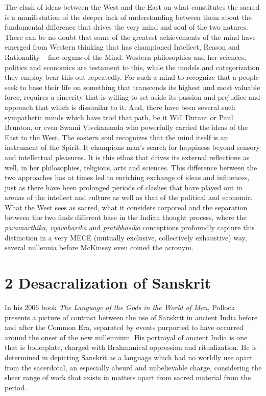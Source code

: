 The clash of ideas between the West and the East on what constitutes the sacred is a manifestation of the deeper lack of understanding between them about the fundamental difference that drives the very mind and soul of the two natures. There can be no doubt that some of the greatest achievements of the mind have emerged from Western thinking that has championed Intellect, Reason and Rationality – fine organs of the Mind. Western philosophies and her sciences, politics and economics are testament to this, while the models and categorization they employ bear this out repeatedly. For such a mind to recognize that a people seek to base their life on something that transcends its highest and most valuable force, requires a sincerity that is willing to set aside its passion and prejudice and approach that which is dissimilar to it. And, there have been several such sympathetic minds which have trod that path, be it Will Durant or Paul Brunton, or even Swami Vivekananda who powerfully carried the ideas of the East to the West. The eastern soul recognizes that the mind itself is an instrument of the Spirit. It champions man’s search for happiness beyond sensory and intellectual pleasures. It is this ethos that drives its external reflections as well, in her philosophies, religions, arts and sciences. This difference between the two approaches has at times led to enriching exchange of ideas and influences, just as there have been prolonged periods of clashes that have played out in arenas of the intellect and culture as well as that of the political and economic. What the West sees as sacred, what it considers corporeal and the separation between the two finds different base in the Indian thought process, where the \textit{pāramārthika}, \textit{vyāvahārika} and \textit{prātibhāsika} conceptions profoundly capture this distinction in a very MECE (mutually exclusive, collectively exhaustive) way, several millennia before McKinsey even coined the acronym.


\section*{2 Desacralization of Sanskrit}

In his 2006 book \textit{The Language of the Gods in the World of Men}, Pollock presents a picture of contrast between the use of Sanskrit in ancient India before and after the Common Era, separated by events purported to have occurred around the onset of the new millennium. His portrayal of ancient India is one that is boilerplate, charged with Brahmanical oppression and ritualization. He is determined in depicting Sanskrit as a language which had no worldly use apart from the sacerdotal, an especially absurd and unbelievable charge, considering the sheer range of work that exists in matters apart from sacred material from the period.

